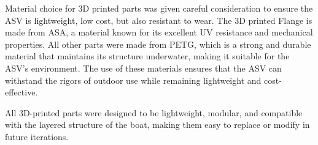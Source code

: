 Material choice for 3D printed parts was given careful consideration to ensure the ASV is lightweight, low cost, but also resistant to wear. The 3D printed Flange is made from ASA, a material known for its excellent UV resistance and mechanical properties. All other parts were made from PETG, which is a strong and durable material that maintains its structure underwater, making it suitable for the ASV's environment. The use of these materials ensures that the ASV can withstand the rigors of outdoor use while remaining lightweight and cost-effective.

All 3D-printed parts were designed to be lightweight, modular, and compatible with the layered structure of the boat, making them easy to replace or modify in future iterations.

